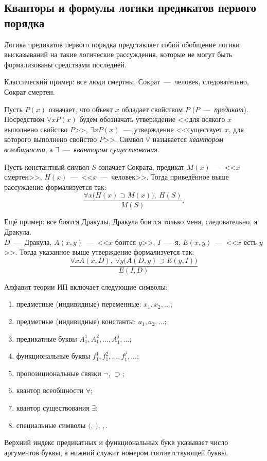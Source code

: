 \subsection{Кванторы и формулы логики предикатов первого порядка}\label{par:first_order_logic}
Логика предикатов первого порядка представляет собой обобщение логики высказываний на такие логические рассуждения, которые не могут быть формализованы средствами последней.

Классический пример: все люди смертны, Сократ~---~человек, следовательно, Сократ смертен.

Пусть $P(x)$ означает, что объект $x$ обладает свойством $P$ ($P$~---~\textit{предикат}). Посредством $\forall xP(x)$ будем обозначать утверждение <<для всякого $x$ выполнено свойство $P$>>, $\exists xP(x)$~---~утверждение <<существует $x$, для которого выполнено свойство $P$>>. Символ $\forall$ называется \textit{квантором всеобщности}, а $\exists$~---~\textit{квантором существования}.

Пусть константный символ $S$ означает Сократа, предикат $M(x)$~---~<<$x$ смертен>>, $H(x)$~---~<<$x$~---~человек>>. Тогда приведённое выше рассуждение формализуется так:
\[
    \frac{\forall x\big(H(x) \supset M(x)\big),\ H(S)}{M(S)}.
\]

Ещё пример: все боятся Дракулы, Дракула боится только меня, следовательно, я Дракула. \\
$D$~---~Дракула, $A(x, y)$~---~<<$x$ боится $y$>>, $I$~---~я, $E(x, y)$~---~<<$x$ есть $y$>>. Тогда указанное выше утверждение формализуется так:
\[
    \frac{\forall xA(x, D),\ \forall y\big(A(D, y) \supset E(y, I)\big)}{E(I, D)}
\]

Алфавит теории ИП включает следующие символы:
\begin{enumerate}
    \item предметные (индивидные) переменные: $x_1, x_2, \dots$;
    \item предметные (индивидные) константы: $a_1, a_2, \dots$;
    \item предикатные буквы $A_1^1, A_1^2, \dots, A_1^j, \dots$;
    \item функциональные буквы $f_1^1, f_1^2, \dots, f_1^j, \dots$;
    \item пропозициональные связки $\neg$, $\supset$;
    \item квантор всеобщности $\forall$;
    \item квантор существования $\exists$;
    \item специальные символы $($, $)$, $,$.
\end{enumerate}
Верхний индекс предикатных и функциональных букв указывает число аргументов буквы, а нижний служит номером соответствующей буквы.

